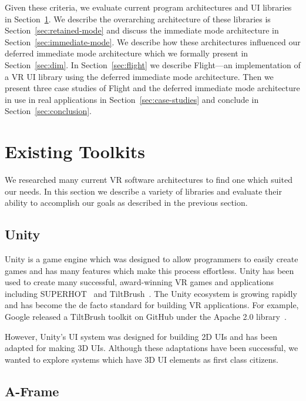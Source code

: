 \documentclass[conference,12pt]{IEEEtran}
\begin{document}
Given these criteria, we evaluate current program architectures and UI libraries
in Section~\ref{sec:existing_tools}. We describe the overarching architecture of
these libraries is Section~\ref{sec:retained-mode} and discuss the immediate
mode architecture in Section~\ref{sec:immediate-mode}. We describe how these
architectures influenced our deferred immediate mode architecture which we
formally present in Section~\ref{sec:dim}. In Section~\ref{sec:flight} we
describe Flight---an implementation of a VR UI library using the deferred
immediate mode architecture. Then we present three case studies of Flight and
the deferred immediate mode architecture in use in real applications in
Section~\ref{sec:case-studies} and conclude in Section~\ref{sec:conclusion}.

\section{Existing Toolkits}\label{sec:existing_tools}

We researched many current VR software architectures to find one which suited
our needs. In this section we describe a variety of libraries and evaluate their
ability to accomplish our goals as described in the previous section.

\subsection{Unity}\label{sec:unity}

Unity is a game engine which was designed to allow programmers to easily create
games and has many features which make this process effortless. Unity has been
used to create many successful, award-winning VR games and applications
including SUPERHOT~\cite{UploadVR:SUPERHOT} and
TiltBrush~\cite{Unity:TiltBrush}. The Unity ecosystem is growing rapidly and has
become the de facto standard for building VR applications. For example, Google
released a TiltBrush toolkit on GitHub under the Apache 2.0
library~\cite{Google:TiltBrush}.

However, Unity's UI system was designed for building 2D UIs and has been adapted
for making 3D UIs. Although these adaptations have been successful, we wanted to
explore systems which have 3D UI elements as first class citizens.

\subsection{A-Frame}\label{sec:aframe}
\end{document}
